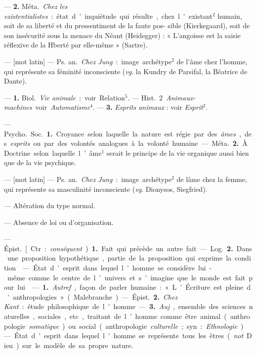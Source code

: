 \begin{itemize}[leftmargin=1cm, label=, itemsep=1pt]
{{{— {\bf 2.} \si{Méta.} {\it Chez les existentialistes} :
état d'inquiétude qui résulte, chez
l'existant$^2$ humain, soit de sa liberté
et du pressentiment de la faute pos-
sible (Kierkegaard), soit de son
insécurité sous la menace du Néant
(Heidegger) : « L'angoisse est la
saisie réflexive de la Hberté par
elle-même » (Sartre).

 — [mot latin] — \si{Ps. an.} {\it Chez
Jung} : image archétype$^2$ de l’âme
chez l’homme, qui représente sa
féminité inconsciente ({\it vg}. la Kundry
de Parsifal, la Béatrice de Dante).

 — {\bf 1.} \si{Biol.} {\it Vie animale} : voir
Relation$^5$. — \si{Hist.} 2 {\it Animaux-machines} voir {\it Automatisme}$^4$. —
 {\bf 3.} {\it Esprits animaux} : voir {\it Esprit}$^2$.

 — \si{Psycho.} \si{Soc.} {\bf 1.} Croyance
selon laquelle la nature est régie par
des {\it âmes}, des {\it esprits} ou par des
volontés analogues à la volonté
humaine.

— \si{Méta.} {\bf 2.} À Doctrine selon laquelle l’âme$^1$ serait le principe de
la vie organique aussi bien que de
la vie psychique.

 — [mot latin] — \si{Ps. an.} {\it Chez
Jung} : image archétype$^2$ de lâme
chez la femme, qui représente sa
masculinité inconsciente ({\it vg}. Dionysos, Siegfried).

 — Altération du type
normal.

 — Absence de loi ou d’organisation.

 — \si{Épist.} [Ctr. : {\it conséquent}). {\bf 1.} Fait qui précède un autre
fait. — \si{Log.} {\bf 2.} Dans une proposition
hypothétique, partie de la proposition qui exprime la condition.

 — État d'esprit
dans lequel l'homme se considère
lui-même comme le centre de l’univers et s’imagine que le monde est
fait pour lui.

 — {\bf 1.} {\it Autref}., façon de
parler humaine : « L’Écriture est
pleine d’anthropologies » (Malebranche).

— \si{Épist.} {\bf 2.} {\it Chez Kant} : étude
philosophique de l'homme. — {\bf 3.}
{\it Auj}., ensemble des sciences naturelles, sociales, etc., traitant de
l’homme comme être animal (anthropologie {\it somatique})
ou social (anthropologie {\it culturelle}; syn. : {\it Ethnologie}).

 — État d'esprit
dans lequel l'homme se représente
tous les êtres ({\it not}. Dieu) sur le
modèle de sa propre nature.

}}}
\end{itemize}
